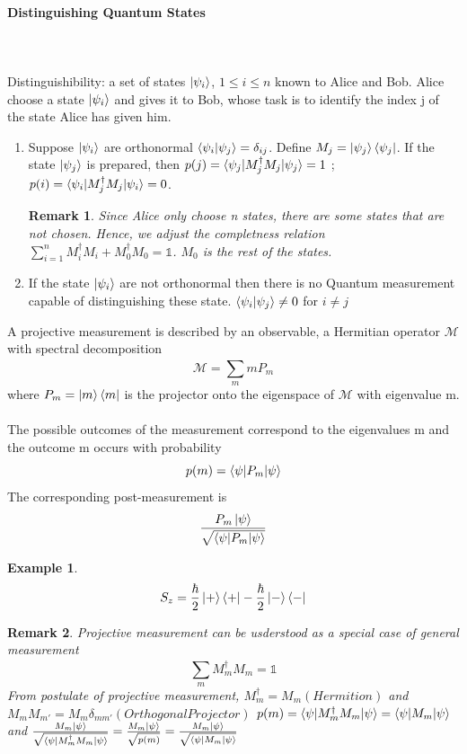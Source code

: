 \documentclass[]{article}
\newtheorem*{remark}{Remark}
\newtheorem*{example}{Example}
\theoremstyle{nonumberplain}
\begin{document}
\paragraph{Distinguishing Quantum States}%
\label{par:paragraph_name}
\ \\
\\
Distinguishibility: a set of states $\ket{\psi_{i}}$, $1 \leq i \leq n$ known to Alice and Bob. Alice choose a state $\ket{\psi_{i}}$ and gives it to Bob, whose task is to identify the index j of the state Alice has given him.
\begin{enumerate}
	\item Suppose $\ket{\psi_{i}}$ are orthonormal $\braket{\psi_{i}|\psi_{j}}=\delta_{ij}$. Define $M_{j}=\ket{\psi_{j}}\bra{\psi_{j}}$. If the state $\ket{\psi_{j}}$ is prepared, then $p(j)=\braket{\psi_{j}|M_{j}^{\dagger}M_{j}|\psi_{j}}=1$ ; $p(i)=\braket{\psi_{i}|M_{j}^{\dagger}M_{j}|\psi_{i}}=0$. 
\begin{remark}
	Since Alice only choose n states, there are some states that are not chosen. Hence, we adjust the completness relation $ \sum^{n}_{i=1} M_{i}^{\dagger}M_{i} + M_{0}^{\dagger}M_{0}=\mathbb{1}$. $M_{0}$ is the rest of the states.
\end{remark}
	\item If the state $\ket{\psi_{i}}$ are not orthonormal then there is no Quantum measurement capable of distinguishing these state. $\braket{\psi_{i}|\psi_{j}}\neq 0$ for $i\neq j$
\end{enumerate}
\begin{postu}
A projective measurement is described by an observable, a Hermitian operator $\mathcal{M}$ with spectral decomposition
\[
\mathcal{M}= \sum^{}_{m} m P_{m}
\] 
where $P_{m}=\ket{m}\bra{m}$ is the projector onto the eigenspace of $\mathcal{M}$ with eigenvalue m. \\ \\
The possible outcomes of the measurement correspond to the eigenvalues m and the outcome m occurs with probability
\[
	p(m)=\braket{\psi|P_{m}|\psi}
\] 
The corresponding post-measurement is 
\[
	\frac{P_{m}\ket{\psi}}{\sqrt{\braket{\psi|P_{m}|\psi}}}
\] 
\end{postu}
\begin{example}
\[
S_{z}=
\frac{\hbar}{2}\ket{+}\bra{+} - \frac{\hbar}{2}\ket{-}\bra{-} 
\] 
\end{example}
\begin{remark}
Projective measurement can be usderstood as a special case of general  measurement
\[
	\sum^{}_{m} M^{\dagger}_{m}M_{m}=\mathbb{1}
\] 
From postulate of projective measurement, $M_{m}^{\dagger}=M_{m} (Hermition)$ and $M_{m}M_{m'}=M_{m}\delta_{mm'} (Orthogonal Projector)$  $p(m) = \braket{\psi|M^{\dagger}_{m}M_{m}|\psi}=\braket{\psi|M_{m}|\psi}$ and $\frac{M_{m}\ket{\psi}}{\sqrt{\braket{\psi|M^{\dagger}_{m}M_{m}|\psi}}}=\frac{M_{m}\ket{\psi}}{\sqrt{p(m)}}=\frac{M_{m}\ket{\psi}}{\sqrt{\braket{\psi|M_{m}|\psi}}}$
\end{remark}
\end{document}
